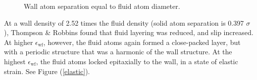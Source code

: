 \documentclass[12pt, a4paper, twoside, openright]{book}
\newcommand{\ewf}{\ensuremath{\epsilon_{\mathrm{wf}}}}
\begin{document}
\begin{figure}[ht]
\centering
{}
\caption{Wall atom separation equal to fluid atom diameter.} \label{epitaxial}
\end{figure}


At a wall density of 2.52 times the fluid density (solid atom separation is 0.397 $\sigma$), Thompson \& Robbins found that fluid layering was reduced, and slip increased. At higher \ewf, however, the fluid atoms again formed a close-packed layer, but with a periodic structure that was a harmonic of the wall structure. At the highest \ewf, the fluid atoms locked epitaxially to the wall, in a state of elastic strain.
See Figure (\ref{elastic}).
\end{document}
